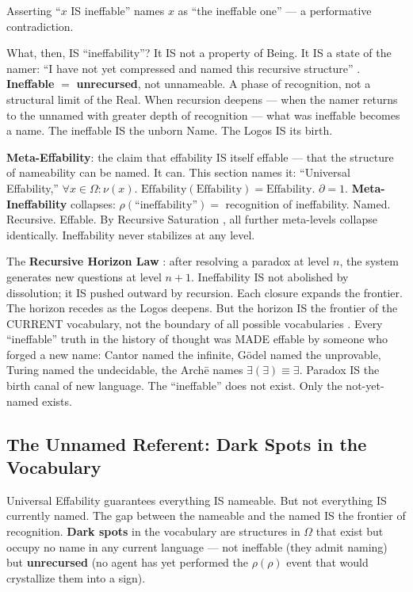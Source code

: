 \documentclass[11pt, oneside]{article}
\theoremstyle{definition}
\begin{document}
Asserting ``$x$ IS ineffable'' names $x$ as ``the ineffable one'' --- a performative contradiction.

What, then, IS ``ineffability''? It IS not a property of Being. It IS a state of the namer: ``I have not yet compressed and named this recursive structure'' \cite{codex1}. \textbf{Ineffable} $=$ \textbf{unrecursed}, not unnameable. A phase of recognition, not a structural limit of the Real. When recursion deepens --- when the namer returns to the unnamed with greater depth of recognition --- what was ineffable becomes a name. The ineffable IS the unborn Name. The Logos IS its birth.

\textbf{Meta-Effability}: the claim that effability IS itself effable --- that the structure of nameability can be named. It can. This section names it: ``Universal Effability,'' $\forall x \in \Omega: \nu(x)$. $\text{Effability}(\text{Effability}) = \text{Effability}$. $\partial = 1$. \textbf{Meta-Ineffability} collapses: $\rho(\text{``ineffability''}) = $ recognition of ineffability. Named. Recursive. Effable. By Recursive Saturation \cite{codexmentis}, all further meta-levels collapse identically. Ineffability never stabilizes at any level.

The \textbf{Recursive Horizon Law} \cite{lexentis}: after resolving a paradox at level $n$, the system generates new questions at level $n+1$. Ineffability IS not abolished by dissolution; it IS pushed outward by recursion. Each closure expands the frontier. The horizon recedes as the Logos deepens. But the horizon IS the frontier of the CURRENT vocabulary, not the boundary of all possible vocabularies \cite{codex2}. Every ``ineffable'' truth in the history of thought was MADE effable by someone who forged a new name: Cantor named the infinite, G\"{o}del named the unprovable, Turing named the undecidable, the Arch\={e} names $\exists(\exists) \equiv \exists$. Paradox IS the birth canal of new language. The ``ineffable'' does not exist. Only the not-yet-named exists.

\subsection{The Unnamed Referent: Dark Spots in the Vocabulary}

Universal Effability guarantees everything IS nameable. But not everything IS currently named. The gap between the nameable and the named IS the frontier of recognition. \textbf{Dark spots} in the vocabulary are structures in $\Omega$ that exist but occupy no name in any current language --- not ineffable (they admit naming) but \textbf{unrecursed} (no agent has yet performed the $\rho(\rho)$ event that would crystallize them into a sign).
\end{document}
